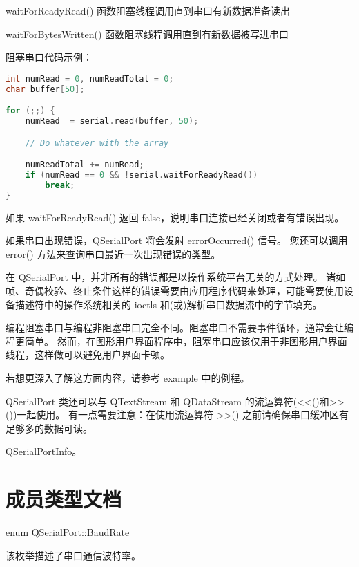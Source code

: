 \begin{compactitem}
\item waitForReadyRead() 函数阻塞线程调用直到串口有新数据准备读出
\item waitForBytesWritten() 函数阻塞线程调用直到有新数据被写进串口
\end{compactitem}

阻塞串口代码示例：

\begin{lstlisting}[language=C++]
int numRead = 0, numReadTotal = 0;
char buffer[50];

for (;;) {
    numRead  = serial.read(buffer, 50);

    // Do whatever with the array

    numReadTotal += numRead;
    if (numRead == 0 && !serial.waitForReadyRead())
        break;
}
\end{lstlisting}

如果 waitForReadyRead() 返回 false，说明串口连接已经关闭或者有错误出现。

如果串口出现错误，QSerialPort 将会发射 errorOccurred() 信号。
您还可以调用 error() 方法来查询串口最近一次出现错误的类型。

\begin{notice}
在 QSerialPort 中，并非所有的错误都是以操作系统平台无关的方式处理。
诸如帧、奇偶校验、终止条件这样的错误需要由应用程序代码来处理，可能需要使用设备描述符中的操作系统相关的 ioctls 和(或)解析串口数据流中的字节填充。
\end{notice}

编程阻塞串口与编程非阻塞串口完全不同。阻塞串口不需要事件循环，通常会让编程更简单。
然而，在图形用户界面程序中，阻塞串口应该仅用于非图形用户界面线程，这样做可以避免用户界面卡顿。

若想更深入了解这方面内容，请参考 example 中的例程。

QSerialPort 类还可以与 QTextStream 和 QDataStream 的流运算符(<<()和>>())一起使用。
有一点需要注意：在使用流运算符 >>() 之前请确保串口缓冲区有足够多的数据可读。

\begin{seeAlso}
QSerialPortInfo。
\end{seeAlso}

\section{成员类型文档}

enum QSerialPort::BaudRate

该枚举描述了串口通信波特率。

